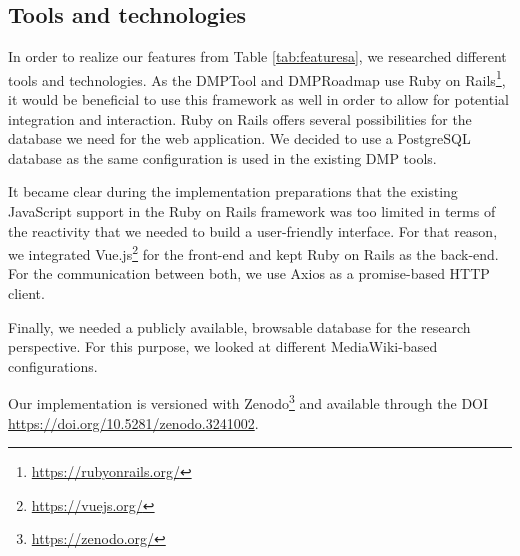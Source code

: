 \documentclass[10pt]{article}
\begin{document}
\subsection{Tools and technologies}
In order to realize our features from Table \ref{tab:featuresa}, we researched different tools and technologies. As the DMPTool and DMPRoadmap use Ruby on Rails\footnote{\url{https://rubyonrails.org/}}, it would be beneficial to use this framework as well in order to allow for potential integration and interaction. Ruby on Rails offers several possibilities for the database we need for the web application. We decided to use a PostgreSQL database as the same configuration is used in the existing DMP tools. 

It became clear during the implementation preparations that the existing JavaScript support in the Ruby on Rails framework was too limited in terms of the reactivity that we needed to build a user-friendly interface. For that reason, we integrated Vue.js\footnote{\url{https://vuejs.org/}} for the front-end and kept Ruby on Rails as the back-end. For the communication between both, we use Axios as a promise-based HTTP client. 

Finally, we needed a publicly available, browsable database for the research perspective. For this purpose, we looked at different MediaWiki-based configurations. 

Our implementation is versioned with Zenodo\footnote{\url{https://zenodo.org/}} and available through the DOI \url{https://doi.org/10.5281/zenodo.3241002}.
\end{document}

